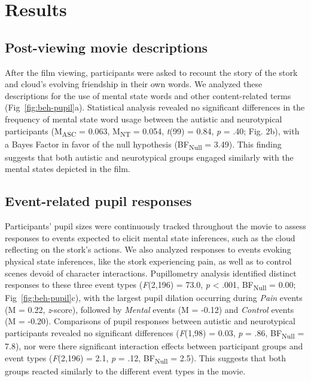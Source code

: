 \section*{Results}
\subsection*{Post-viewing movie descriptions }
After the film viewing, participants were asked to recount the story of the stork and cloud's evolving friendship in their own words. We analyzed these descriptions for the use of mental state words and other content-related terms (Fig~\ref{fig:beh-pupil}a). Statistical analysis revealed no significant differences in the frequency of mental state word usage between the autistic and neurotypical participants (M\textsubscript{ASC} = 0.063, M\textsubscript{NT} = 0.054, \textit{t}(99) = 0.84, \textit{p} = .40; Fig. 2b), with a Bayes Factor in favor of the null hypothesis (BF\textsubscript{Null} = 3.49). This finding suggests that both autistic and neurotypical groups engaged similarly with the mental states depicted in the film.



\subsection*{Event-related pupil responses}
Participants' pupil sizes were continuously tracked throughout the movie to assess responses to events expected to elicit mental state inferences, such as the cloud reflecting on the stork's actions. We also analyzed responses to events evoking physical state inferences, like the stork experiencing pain, as well as to control scenes devoid of character interactions. Pupillometry analysis identified distinct responses to these three event types (\textit{F}(2,196) = 73.0, \textit{p} < .001, BF\textsubscript{Null} = 0.00; Fig~\ref{fig:beh-pupil}c), with the largest pupil dilation occurring during \textit{Pain} events (M = 0.22, \textit{z}-score), followed by \textit{Mental} events (M = -0.12) and \textit{Control} events (M = -0.20). Comparisons of pupil responses between autistic and neurotypical participants revealed no significant differences (\textit{F}(1,98) = 0.03, \textit{p} = .86, BF\textsubscript{Null} = 7.8), nor were there significant interaction effects between participant groups and event types (\textit{F}(2,196) = 2.1, \textit{p} = .12, BF\textsubscript{Null} = 2.5). This suggests that both groups reacted similarly to the different event types in the movie.

